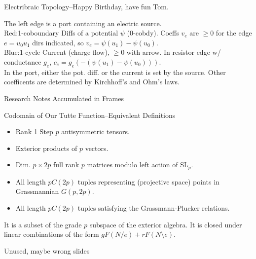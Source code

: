 \documentclass{beamer}
\newcommand{\Remph}[1]{{\color{red}#1}}
\newcommand{\Bemph}[1]{{\color{blue}#1}}
\begin{document}
\begin{frame}{Electribraic Topology--Happy Birthday, have fun Tom.}
  \begin{minipage}{0.5\textwidth}
    The left edge is a port containing an electric source.\\
    \Remph{Red:1-coboundary} Diffs of a potential $\psi$ (0-cobdy).  Coeffs \Remph{$v_e$} are $\ge 0$
    for the edge $e=u_0u_1$ dirs indicated, so \Remph{$v_e=\psi(u_1)-\psi(u_0)$}.\\
    \Bemph{Blue:1-cycle} Current (charge flow), $\ge 0$ with arrow. In resistor edge w/ conductance $g_e$,
    \Bemph{$c_e=g_e(-(\psi(u_1)-\psi(u_0)))$}.\\
    In the port, either the pot. diff. or the current is set by the source.  Other
    coefficents are determined by Kirchhoff's and Ohm's laws.
  \end{minipage}
  \begin{minipage}{0.40\textwidth}
    
  \end{minipage}
\end{frame}


\begin{frame}{Research Notes Accumulated in Frames}
\end{frame}

\begin{frame}{Codomain of Our Tutte Function--Equivalent Definitions}
  \begin{itemize}
  \item Rank 1 Step $p$ antisymmetric tensors.
  \item Exterior products of $p$ vectors.
  \item Dim. $p \times 2p$ full rank $p$ matrices modulo left action
    of SL$_p$.
  \item All length $p C (2p)$ tuples representing (projective space) points in Grassmannian
    $G(p,2p)$.
    \item All length $p C (2p)$ tuples satisfying the Grassmann-Plucker relations.
  \end{itemize}
  It is a subset of the grade  $p$ subspace of the exterior algebra.  It is closed under
  linear combinations of the form $g F(N/e) + r F(N\setminus e)$.
\end{frame}
  


\begin{frame}{Unused, maybe wrong slides}
\end{frame}
 
\end{document}
